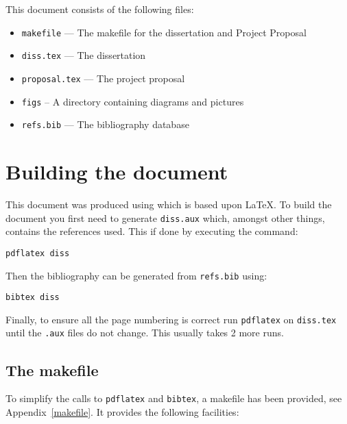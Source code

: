 \documentclass[12pt,a4paper,twoside,openright, hidelinks]{report}
\begin{document}
This document consists of the following files:

\begin{itemize}
\item \texttt{makefile} --- The makefile for the dissertation and
                         Project Proposal
\item \texttt{diss.tex} --- The dissertation
\item \texttt{proposal.tex}  --- The project proposal 
\item \texttt{figs} -- A directory containing diagrams and pictures
\item \texttt{refs.bib} --- The bibliography database
\end{itemize}

\section{Building the document}

This document was produced using \LaTeXe which is based upon
\LaTeX\cite{Lamport86}.  To build the document you first need to
generate \texttt{diss.aux} which, amongst other things, contains the
references used.  This if done by executing the command:

\texttt{pdflatex diss}

\noindent
Then the bibliography can be generated from \texttt{refs.bib} using:

\texttt{bibtex diss}

\noindent
Finally, to ensure all the page numbering is correct run \texttt{pdflatex}
on \texttt{diss.tex} until the \texttt{.aux} files do not change.  This
usually takes 2 more runs.

\subsection{The makefile}

To simplify the calls to \texttt{pdflatex} and \texttt{bibtex}, 
a makefile has been provided, see Appendix~\ref{makefile}. 
It provides the following facilities:
\end{document}
